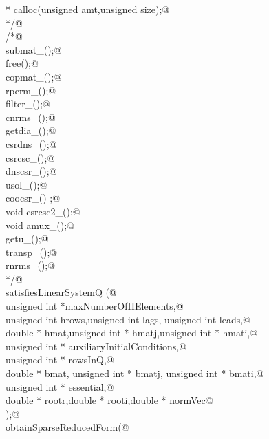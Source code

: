 \documentclass[12pt]{article}
\begin{document}
\begin{flushleft}
\begin{minipage}{\linewidth}
\begin{list}{}{}
\mbox{}\verb@void * calloc(unsigned amt,unsigned size);@\\
\mbox{}\verb@*/@\\
\mbox{}\verb@/*@\\
\mbox{}\verb@void submat_();@\\
\mbox{}\verb@void free();@\\
\mbox{}\verb@void copmat_();@\\
\mbox{}\verb@void rperm_();@\\
\mbox{}\verb@void filter_();@\\
\mbox{}\verb@void cnrms_();@\\
\mbox{}\verb@void getdia_();@\\
\mbox{}\verb@void csrdns_();@\\
\mbox{}\verb@void csrcsc_();@\\
\mbox{}\verb@void dnscsr_();@\\
\mbox{}\verb@void usol_();@\\
\mbox{}\verb@int coocsr_() ;@\\
\mbox{}\verb@extern void csrcsc2_();@\\
\mbox{}\verb@extern void amux_();@\\
\mbox{}\verb@void getu_();@\\
\mbox{}\verb@void transp_();@\\
\mbox{}\verb@void rnrms_();@\\
\mbox{}\verb@*/@\\
\mbox{}\verb@int satisfiesLinearSystemQ (@\\
\mbox{}\verb@        unsigned int *maxNumberOfHElements,@\\
\mbox{}\verb@        unsigned int hrows,unsigned int lags,   unsigned int leads,@\\
\mbox{}\verb@        double * hmat,unsigned int * hmatj,unsigned int * hmati,@\\
\mbox{}\verb@        unsigned int *  auxiliaryInitialConditions,@\\
\mbox{}\verb@        unsigned int *  rowsInQ,@\\
\mbox{}\verb@        double * bmat, unsigned int * bmatj, unsigned int * bmati,@\\
\mbox{}\verb@        unsigned int * essential,@\\
\mbox{}\verb@        double * rootr,double * rooti,double * normVec@\\
\mbox{}\verb@);@\\
\mbox{}\verb@void obtainSparseReducedForm(@\\
\mbox{}\verb@@\\

\end{list}
\end{minipage}
\end{flushleft}
\end{document}
